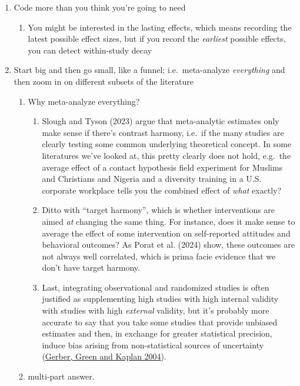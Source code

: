 \documentclass[
  man]{apa6}
\providecommand{\tightlist}{%
  \setlength{\itemsep}{0pt}\setlength{\parskip}{0pt}}
\begin{document}
\begin{enumerate}
\def\labelenumi{\arabic{enumi}.}
\tightlist
\item
  Code more than you think you're going to need

  \begin{enumerate}
  \def\labelenumii{\arabic{enumii}.}
  \tightlist
  \item
    You might be interested in the lasting effects, which means recording the latest possible effect sizes, but if you record the \emph{earliest} possible effects, you can detect within-study decay
  \end{enumerate}
\item
  Start big and then go small, like a funnel; i.e.~meta-analyze \emph{everything} and then zoom in on different subsets of the literature

  \begin{enumerate}
  \def\labelenumii{\arabic{enumii}.}
  \setcounter{enumii}{1}
  \tightlist
  \item
    Why meta-analyze everything?

    \begin{enumerate}
    \def\labelenumiii{\arabic{enumiii}.}
    \tightlist
    \item
      Slough and Tyson (2023) argue that meta-analytic estimates only make sense if there's contrast harmony, i.e.~if the many studies are clearly testing some common underlying theoretical concept. In some literatures we've looked at, this pretty clearly does not hold, e.g.~the average effect of a contact hypothesis field experiment for Muslims and Christians and Nigeria and a diversity training in a U.S. corporate workplace tells you the combined effect of \emph{what} exactly?
    \item
      Ditto with ``target harmony'', which is whether interventions are aimed \emph{at} changing the same thing. For instance, does it make sense to average the effect of some intervention on self-reported attitudes and behavioral outcomes? As Porat et al. (2024) show, these outcomes are not always well correlated, which is prima facie evidence that we don't have target harmony.
    \item
      Last, integrating observational and randomized studies is often justified as supplementing high studies with high internal validity with studies with high \emph{external} validity, but it's probably more accurate to say that you take some studies that provide unbiased estimates and then, in exchange for greater statistical precision, induce bias arising from non-statistical sources of uncertainty (\href{http://www.donaldgreen.com/wp-content/uploads/2015/09/Gerber-Green-Kaplan-IllusionofLearning.pdf}{Gerber, Green and Kaplan 2004}).
    \end{enumerate}
  \item
    multi-part answer.


\end{enumerate}
\end{enumerate}
\end{document}
